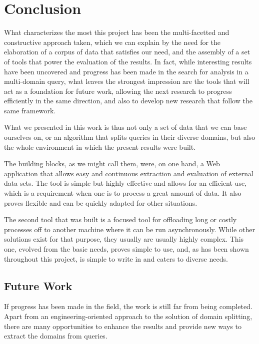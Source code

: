 \chapter{Conclusion} %
\label{cha:conclusion}

What characterizes the most this project has been the multi-facetted and constructive approach taken, which we can explain by the need for the elaboration of a corpus of data that satisfies our need, and the assembly of a set of tools that power the evaluation of the results. In fact, while interesting results have been uncovered and progress has been made in the search for analysis in a multi-domain query, what leaves the strongest impression are the tools that will act as a foundation for future work, allowing the next research to progress efficiently in the same direction, and also to develop new research that follow the same framework.

What we presented in this work is thus not only a set of data that we can base ourselves on, or an algorithm that splits queries in their diverse domains, but also the whole environment in which the present results were built.

The building blocks, as we might call them, were, on one hand, a Web application that allows easy and continuous extraction and evaluation of external data sets. The tool is simple but highly effective and allows for an efficient use, which is a requirement when one is to process a great amount of data. It also proves flexible and can be quickly adapted for other situations.

The second tool that was built is a focused tool for offloading long or costly processes off to another machine where it can be run asynchronously. While other solutions exist for that purpose, they usually are usually highly complex. This one, evolved from the basic needs, proves simple to use, and, as has been shown throughout this project, is simple to write in and caters to diverse needs.

\section{Future Work} %
\label{sec:future_work}

If progress has been made in the field, the work is still far from being completed. Apart from an engineering-oriented approach to the solution of domain splitting, there are many opportunities to enhance the results and provide new ways to extract the domains from queries.

